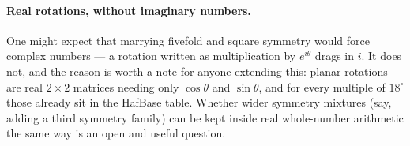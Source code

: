 \documentclass[11pt]{article}
\begin{document}
\paragraph{Real rotations, without imaginary numbers.} One might expect that marrying fivefold and
square symmetry would force complex numbers --- a rotation written as multiplication by $e^{i\theta}$
drags in $i$. It does not, and the reason is worth a note for anyone extending this: planar rotations are
real $2\times2$ matrices needing only $\cos\theta$ and $\sin\theta$, and for every multiple of $18^\circ$
those already sit in the HafBase table. Whether wider symmetry mixtures (say, adding a third symmetry family)
can be kept inside real whole-number arithmetic the same way is an open and useful question.
\end{document}
